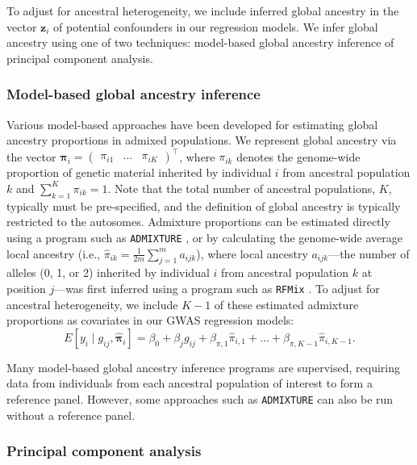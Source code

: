 \documentclass[12pt]{article}
\newcommand{\edit}[1]{{\color{red}{#1}}}
\begin{document}
To adjust for ancestral heterogeneity, we include inferred global ancestry in the vector $\mathbf{z}_i$ of potential confounders in our regression models. We infer global ancestry using one of two techniques: model-based global ancestry inference of principal component analysis.

\edit{Note: should some of the following should perhaps go to the Introduction section instead?}

\subsubsection{Model-based global ancestry inference}

Various model-based approaches have been developed for estimating global ancestry proportions in admixed populations.
We represent global ancestry via the vector $\boldsymbol{\pi}_i = \begin{pmatrix} \pi_{i1} & \dots & \pi_{iK} \end{pmatrix}^\top$, where $\pi_{ik}$ denotes the genome-wide proportion of genetic material inherited by individual $i$ from ancestral population $k$ and $\sum_{k=1}^K \pi_{ik} = 1$. 
Note that the total number of ancestral populations, $K$, typically must be pre-specified, and the definition of global ancestry is typically restricted to the autosomes.
Admixture proportions can be estimated directly using a program such as \texttt{ADMIXTURE} \citep{admixture}, or by calculating the genome-wide average local ancestry (i.e., $\hat\pi_{ik} = \frac{1}{2m} \sum_{j=1}^m a_{ijk}$), where local ancestry $a_{ijk}$---the number of alleles (0, 1, or 2) inherited by individual $i$ from ancestral population $k$ at position $j$---was first inferred using a program such as \texttt{RFMix} \citep{rfmix}.
To adjust for ancestral heterogeneity, we include $K-1$ of these estimated admixture proportions as covariates in our GWAS regression models: $$E[y_i \mid g_{ij}, \hat{\boldsymbol\pi}_i] = \beta_0 + \beta_j g_{ij} + \beta_{\pi, 1} \hat\pi_{i,1} + \dots + \beta_{\pi, K-1} \hat\pi_{i, K-1}.$$

Many model-based global ancestry inference programs are supervised, requiring data from individuals from each ancestral population of interest to form a reference panel. However, some approaches such as \texttt{ADMIXTURE} can also be run without a reference panel.

\subsubsection{Principal component analysis}
\end{document}
